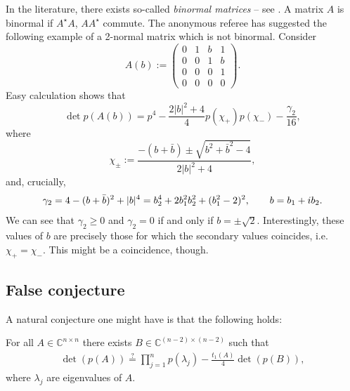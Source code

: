 \documentclass[10pt,a4paper,reqno]{amsart}
\newcommand{\zav}[1]{\left( #1 \right)}
\newcommand{\imag}{{\rm i}}
\newcommand{\deter}[1]{\det\zav{#1}}
\begin{document}
In the literature, there exists so-called \textit{binormal matrices} -- see \cite{Ikramov}. A matrix $A$ is binormal if $A^\star A$, $AA^\star$  commute. 
The anonymous referee has suggested the following example of a 2-normal matrix which is not binormal. Consider
$$
A(b):=\zav{\begin{array}{cccc}
0 & 1 & b & 1 \\
0 & 0 & 1 & b \\
0 & 0 & 0 & 1 \\
0& 0 & 0 & 0
\end{array}}.
$$
Easy calculation shows that 
$$
\det{p(A(b))}=p^4-\frac{2|b|^2+4}{4}p(\chi_+)p(\chi_-)-\frac{\gamma_2}{16},
$$
where
$$
\chi_\pm:=\frac{-(b+\bar b)\pm \sqrt{b^2+{\bar b}^2-4}}{2|b|^2+4},
$$
and, crucially,
$$
\gamma_2=4-(b+\bar b)^2+|b|^4=b_2^4+2b_1^2b_2^2+(b_1^2-2)^2,\qquad b=b_1+\imag b_2.
$$
We can see that $\gamma_2\geq 0$ and $\gamma_2=0$ if and only if $b=\pm\sqrt{2}$. Interestingly, these values of $b$ are precisely those for which the secondary values coincides, i.e. $\chi_+=\chi_{-}$. This might be a coincidence, though.

\subsection*{False conjecture}
A natural conjecture one might have is that the following holds:

For all $A\in \mathbb{C}^{n\times n}$ there exists $B\in \mathbb{C}^{(n-2)\times (n-2)}$ such that
\begin{align}\label{falsecon}
\deter{p(A)}\stackrel{?}{=}\prod_{j=1}^n p(\lambda_j)-\frac{t_1(A)}{4}\deter{p(B)},
\end{align}
where $\lambda_j$ are eigenvalues of $A$.
\end{document}
